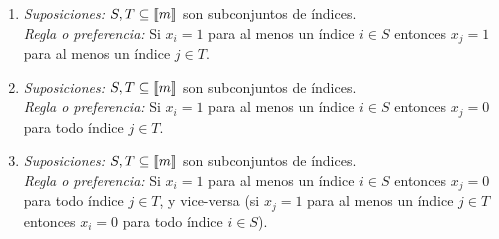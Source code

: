 \documentclass[ a4paper, twoside, 11pt]{article}
\begin{document}
\begin{problem}
\begin{enumerate}[label=\alph*)]
\item \emph{Suposiciones:} $S, T \subseteq \llbracket m \rrbracket$ son subconjuntos de \'indices. \\
\emph{Regla o preferencia:} Si $x_i = 1$ para al menos un \'indice $i \in S$ entonces $x_j = 1$ para al menos un \'indice $j \in T$. 

\item \emph{Suposiciones:} $S, T \subseteq \llbracket m \rrbracket$ son subconjuntos de \'indices. \\
\emph{Regla o preferencia:} Si $x_i = 1$ para al menos un \'indice $i \in S$ entonces $x_j = 0$ para todo \'indice $j \in T$. 

\item \emph{Suposiciones:} $S, T \subseteq \llbracket m \rrbracket$ son subconjuntos de \'indices. \\
\emph{Regla o preferencia:} Si $x_i = 1$ para al menos un \'indice $i \in S$ entonces $x_j = 0$ para todo \'indice $j \in T$, y vice-versa (\ie si $x_j = 1$ para al menos un \'indice $j \in T$ entonces $x_i = 0$ para todo \'indice $i \in S$). 

\end{enumerate}
\QED

\end{problem}
\vspace{\baselineskip}
\end{document}
